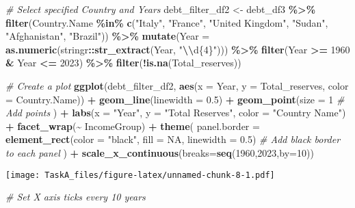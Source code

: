 \documentclass[
]{article}
\newenvironment{Shaded}{\begin{snugshade}}{\end{snugshade}}
\newcommand{\AttributeTok}[1]{\textcolor[rgb]{0.13,0.29,0.53}{#1}}
\newcommand{\CommentTok}[1]{\textcolor[rgb]{0.56,0.35,0.01}{\textit{#1}}}
\newcommand{\ConstantTok}[1]{\textcolor[rgb]{0.56,0.35,0.01}{#1}}
\newcommand{\DecValTok}[1]{\textcolor[rgb]{0.00,0.00,0.81}{#1}}
\newcommand{\FloatTok}[1]{\textcolor[rgb]{0.00,0.00,0.81}{#1}}
\newcommand{\FunctionTok}[1]{\textcolor[rgb]{0.13,0.29,0.53}{\textbf{#1}}}
\newcommand{\NormalTok}[1]{#1}
\newcommand{\OtherTok}[1]{\textcolor[rgb]{0.56,0.35,0.01}{#1}}
\newcommand{\SpecialCharTok}[1]{\textcolor[rgb]{0.81,0.36,0.00}{\textbf{#1}}}
\newcommand{\StringTok}[1]{\textcolor[rgb]{0.31,0.60,0.02}{#1}}
\begin{document}
\begin{Shaded}
\begin{Highlighting}[]
\CommentTok{\# Select specified Country and Years}
\NormalTok{debt\_filter\_df2 }\OtherTok{\textless{}{-}}\NormalTok{ debt\_df3 }\SpecialCharTok{\%\textgreater{}\%}
  \FunctionTok{filter}\NormalTok{(Country.Name }\SpecialCharTok{\%in\%} \FunctionTok{c}\NormalTok{(}\StringTok{"Italy"}\NormalTok{, }\StringTok{"France"}\NormalTok{, }\StringTok{"United Kingdom"}\NormalTok{, }\StringTok{"Sudan"}\NormalTok{, }\StringTok{"Afghanistan"}\NormalTok{, }\StringTok{"Brazil"}\NormalTok{)) }\SpecialCharTok{\%\textgreater{}\%}
  \FunctionTok{mutate}\NormalTok{(}\AttributeTok{Year =} \FunctionTok{as.numeric}\NormalTok{(stringr}\SpecialCharTok{::}\FunctionTok{str\_extract}\NormalTok{(Year, }\StringTok{"}\SpecialCharTok{\textbackslash{}\textbackslash{}}\StringTok{d\{4\}"}\NormalTok{))) }\SpecialCharTok{\%\textgreater{}\%} 
  \FunctionTok{filter}\NormalTok{(Year }\SpecialCharTok{\textgreater{}=} \StringTok{\textquotesingle{}1960\textquotesingle{}} \SpecialCharTok{\&}\NormalTok{ Year }\SpecialCharTok{\textless{}=} \StringTok{\textquotesingle{}2023\textquotesingle{}}\NormalTok{) }\SpecialCharTok{\%\textgreater{}\%}
  \FunctionTok{filter}\NormalTok{(}\SpecialCharTok{!}\FunctionTok{is.na}\NormalTok{(Total\_reserves)) }

\CommentTok{\# Create a plot}
\FunctionTok{ggplot}\NormalTok{(debt\_filter\_df2, }\FunctionTok{aes}\NormalTok{(}\AttributeTok{x =}\NormalTok{ Year, }\AttributeTok{y =}\NormalTok{ Total\_reserves, }\AttributeTok{color =}\NormalTok{ Country.Name)) }\SpecialCharTok{+}
  \FunctionTok{geom\_line}\NormalTok{(}\AttributeTok{linewidth =} \FloatTok{0.5}\NormalTok{) }\SpecialCharTok{+}
  \FunctionTok{geom\_point}\NormalTok{(}\AttributeTok{size =} \DecValTok{1} \CommentTok{\# Add points}
\NormalTok{             ) }\SpecialCharTok{+}
  \FunctionTok{labs}\NormalTok{(}\AttributeTok{x =} \StringTok{"Year"}\NormalTok{, }\AttributeTok{y =} \StringTok{"Total Reserves"}\NormalTok{, }\AttributeTok{color =} \StringTok{"Country Name"}\NormalTok{) }\SpecialCharTok{+}
  \FunctionTok{facet\_wrap}\NormalTok{(}\SpecialCharTok{\textasciitilde{}}\NormalTok{ IncomeGroup) }\SpecialCharTok{+} 
  \FunctionTok{theme}\NormalTok{(}
    \AttributeTok{panel.border =} \FunctionTok{element\_rect}\NormalTok{(}\AttributeTok{color =} \StringTok{"black"}\NormalTok{, }\AttributeTok{fill =} \ConstantTok{NA}\NormalTok{, }\AttributeTok{linewidth =} \FloatTok{0.5}\NormalTok{)  }
    \CommentTok{\# Add black border to each panel}
\NormalTok{  ) }\SpecialCharTok{+}
  \FunctionTok{scale\_x\_continuous}\NormalTok{(}\AttributeTok{breaks=}\FunctionTok{seq}\NormalTok{(}\DecValTok{1960}\NormalTok{,}\DecValTok{2023}\NormalTok{,}\AttributeTok{by=}\DecValTok{10}\NormalTok{)) }
\end{Highlighting}
\end{Shaded}

\texttt{[image: TaskA\_files/figure-latex/unnamed-chunk-8-1.pdf]}

\begin{Shaded}
\begin{Highlighting}[]
\CommentTok{\# Set X axis ticks every 10 years}
\end{Highlighting}
\end{Shaded}
\end{document}
